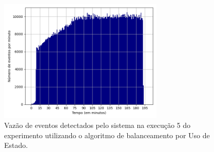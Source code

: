 



\begin{figure}[h]
\centering
\includegraphics[width=0.7\textwidth]{figuras/graphics/histogram_vazao_10-dez-su.png}
\caption{Vazão de eventos detectados pelo sistema na execução 5 do experimento utilizando o algoritmo de balanceamento por Uso de Estado.}
\label{fig:vazao_9-dez-su}
\end{figure}





